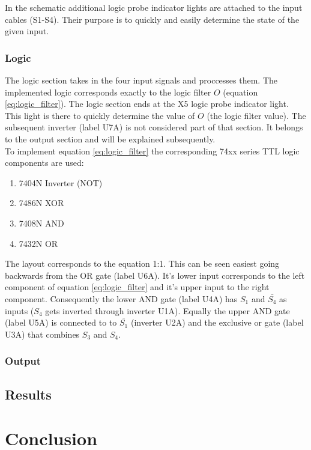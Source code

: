 \documentclass[14pt]{article}
\begin{document}
In the schematic additional logic probe indicator lights are attached to the input cables (S1-S4). Their purpose is to quickly and easily
determine the state of the given input.

\subsubsection{Logic}

The logic section takes in the four input signals and proccesses them. The implemented logic corresponds exactly to the logic filter
$O$ (equation \ref{eq:logic_filter}). The logic section ends at the X5 logic probe indicator light. This light is there to quickly
determine the value of $O$ (the logic filter value). The subsequent inverter (label U7A) is not considered
part of that section. It belongs to the output section and will be explained subsequently.\\

To implement equation \ref{eq:logic_filter} the corresponding 74xx series TTL logic components are used:

\begin{enumerate}
  \item 7404N Inverter (NOT) 
  \item 7486N XOR 
  \item 7408N AND 
  \item 7432N OR  
\end{enumerate}

The layout corresponds to the equation 1:1. This can be seen easiest going backwards from the OR gate (label U6A). It's lower
input corresponds to the left component of equation \ref{eq:logic_filter} and it's upper input to the right component. Consequently the lower
AND gate (label U4A) has $S_1$ and $\bar{S_4}$ as inputs ($S_4$ gets inverted through inverter U1A). Equally the upper AND gate (label U5A) is
connected to to $\bar{S_1}$ (inverter U2A) and the exclusive or gate (label U3A) that combines $S_3$ and $S_4$.

\subsubsection{Output}




\subsection{Results}

\section{Conclusion}


\printbibliography
\end{document}
